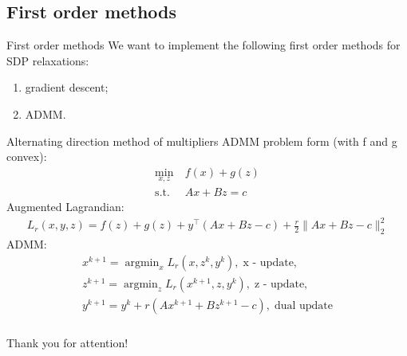 \documentclass[10pt]{beamer}
\newcommand{\argmin}{\mathop{\mathrm{argmin}}}
\begin{document}
    \subsection{First order methods}
        \begin{frame}{First order methods}
            We want to implement the following first order methods for SDP relaxations:
            \begin{enumerate}
                \item gradient descent;
                \item ADMM.
            \end{enumerate}
            
        \end{frame}
        
        \begin{frame}{Alternating direction method of multipliers}
            ADMM problem form (with f and g convex):
            \begin{align*}
                \min_{x, z} &~f(x) + g(z)\\
                \text{s.t.} &~Ax + Bz = c
            \end{align*}
            Augmented Lagrandian:
            \begin{align*}
                L_r(x,y,z)=f(z) + g(z) + y^{\top}(Ax + Bz - c) + \frac{r}{2}\| Ax + Bz - c\|^2_2
            \end{align*}
            ADMM:
            \begin{gather*}
                x^{k+1}=\argmin_x L_r (x, z^k, y^k), \; \text{x - update},\\
                z^{k+1}=\argmin_z L_r (x^{k+1}, z, y^k), \; \text{z - update},\\
                y^{k+1}=y^k + r (Ax^{k+1} + Bz^{k+1} - c), \; \text{dual update}
            \end{gather*}
            
        \end{frame}
		
	
	\begin{frame}
		\frametitle{}
		
		\begin{center}
			{\LARGE Thank you for attention!}
		\end{center}
		
	\end{frame}
	
\end{document}
